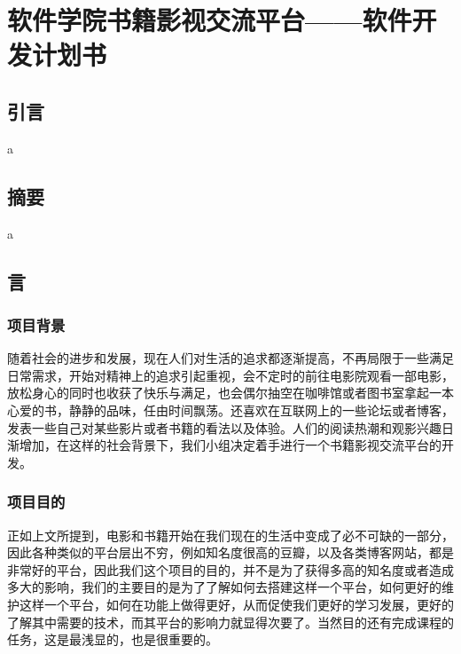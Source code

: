 \documentclass[
]{article}
\author{}
\date{}
\begin{document}
\hypertarget{header-n0}{%
\section{软件学院书籍影视交流平台------软件开发计划书}\label{header-n0}}

\hypertarget{header-n2}{%
\subsection{引言}\label{header-n2}}

a

\hypertarget{header-n641}{%
\subsection{摘要}\label{header-n641}}

a

\hypertarget{header-n638}{%
\subsection{言}\label{header-n638}}

\hypertarget{header-n3}{%
\subsubsection{项目背景}\label{header-n3}}

随着社会的进步和发展，现在人们对生活的追求都逐渐提高，不再局限于一些满足日常需求，开始对精神上的追求引起重视，会不定时的前往电影院观看一部电影，放松身心的同时也收获了快乐与满足，也会偶尔抽空在咖啡馆或者图书室拿起一本心爱的书，静静的品味，任由时间飘荡。还喜欢在互联网上的一些论坛或者博客，发表一些自己对某些影片或者书籍的看法以及体验。人们的阅读热潮和观影兴趣日渐增加，在这样的社会背景下，我们小组决定着手进行一个书籍影视交流平台的开发。

\hypertarget{header-n5}{%
\subsubsection{项目目的}\label{header-n5}}

正如上文所提到，电影和书籍开始在我们现在的生活中变成了必不可缺的一部分，因此各种类似的平台层出不穷，例如知名度很高的豆瓣，以及各类博客网站，都是非常好的平台，因此我们这个项目的目的，并不是为了获得多高的知名度或者造成多大的影响，我们的主要目的是为了了解如何去搭建这样一个平台，如何更好的维护这样一个平台，如何在功能上做得更好，从而促使我们更好的学习发展，更好的了解其中需要的技术，而其平台的影响力就显得次要了。当然目的还有完成课程的任务，这是最浅显的，也是很重要的。
\end{document}
